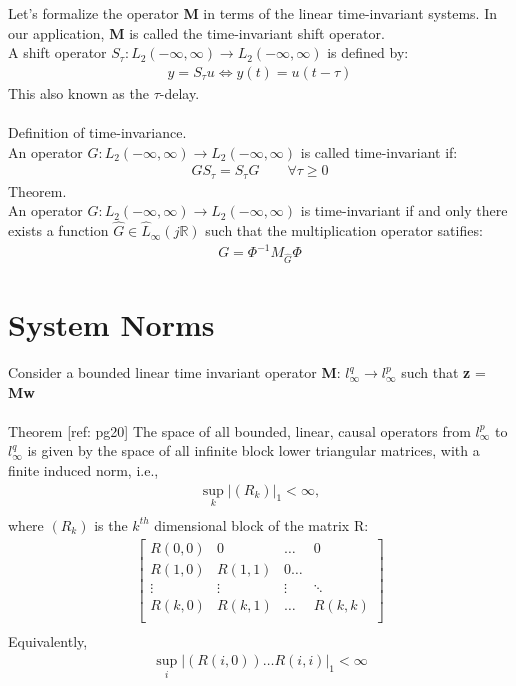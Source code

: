 \documentclass{article}[12pt]
\def\R{\mathbb{R}}
\def \R{\mathbb R}
\begin{document}
Let's formalize the operator \textbf{M} in terms of the linear time-invariant systems. In our application, \textbf{M} is called the time-invariant shift operator.\\ 
A shift operator $S_{\tau}:L_2(-\infty,\infty) \xrightarrow{} L_2(-\infty,\infty)$ is defined by:
\begin{align*}
    y = S_{\tau}u \Longleftrightarrow{} y(t) = u(t-\tau)
\end{align*}
\quad This also known as the $\tau$-delay.\\ \\
Definition of time-invariance.\\
An operator $G: L_2(-\infty,\infty) \xrightarrow{} L_2(-\infty,\infty)$ is called time-invariant if:
\begin{align*}
    GS_{\tau} = S_{\tau}G  \qquad \forall \tau \geq 0
\end{align*}
Theorem.\\
An operator $G: L_2(-\infty,\infty) \xrightarrow{} L_2(-\infty,\infty)$ is time-invariant if and only there exists a function  $\hat{G} \in \hat{L}_{\infty}(j \mathbb{R})$ such that the multiplication operator satifies:\\
\begin{align*}
    G = \Phi ^{-1}M_{\hat{G}}\Phi
\end{align*}

\section{System Norms}
Consider a bounded linear time invariant operator \textbf{M}: $l^{q}_{\infty} \xrightarrow{} l^p_{\infty}$ such that \textbf{z} = \textbf{Mw}\\ \\
Theorem [ref: pg20]
The space of all bounded, linear, causal operators from $l_{\infty}^p$ to $l_{\infty}^q$ is given by the space of all infinite block lower triangular matrices, with a finite induced norm, i.e., 
\begin{align*}
    \sup_k\lvert(R_k)\rvert_1 < \infty,\\
\end{align*}
where $(R_k)$ is the $k^{th}$ dimensional block of the matrix R:\\
\begin{align*}
    \begin{bmatrix} R(0,0)&0&\dots&0\\R(1,0)&R(1,1)&0\dots\\ \vdots&\vdots&\vdots&\ddots\\
    R(k,0)&R(k,1)&\dots&R(k,k)\\
    \end{bmatrix}\\
\end{align*}
Equivalently,\\
\begin{align*}
    \sup_i\lvert(R(i,0)) \dots R(i,i)\rvert_1 < \infty
\end{align*}
\end{document}
